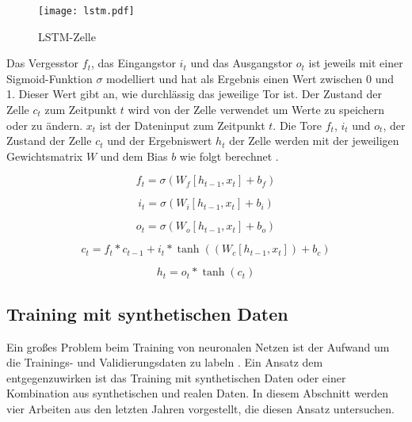 \begin{figure}[h]
\centering
\texttt{[image: lstm.pdf]}
\caption{\acl{LSTM}-Zelle \cite{olah2015lstm}}
\label{fig_lstm}
\end{figure}

Das Vergesstor $f_t$, das Eingangstor $i_t$ und das Ausgangstor $o_t$ ist jeweils mit einer Sigmoid-Funktion $\sigma$ modelliert und hat als Ergebnis einen Wert zwischen 0 und 1. Dieser Wert gibt an, wie durchlässig das jeweilige Tor ist. Der Zustand der Zelle $c_t$ zum Zeitpunkt $t$ wird von der Zelle verwendet um Werte zu speichern oder zu ändern. $x_t$ ist der Dateninput zum Zeitpunkt $t$. Die Tore $f_t$, $i_t$ und $o_t$, der Zustand der Zelle $c_t$ und der Ergebniswert $h_t$ der Zelle werden mit der jeweiligen Gewichtsmatrix $W$ und dem Bias $b$ wie folgt berechnet \cite{olah2015lstm}.

\begin{equation}
f_t = \sigma (W_f[h_{t-1}, x_t] + b_f)
\end{equation}

\begin{equation}
i_t = \sigma (W_i[h_{t-1}, x_t] + b_i)
\end{equation}

\begin{equation}
o_t = \sigma (W_o[h_{t-1}, x_t] + b_o)
\end{equation}

\begin{equation}
c_t = f_t * c_{t-1} + i_t * \tanh((W_c[h_{t-1}, x_t]) + b_c)
\end{equation}

\begin{equation}
h_t = o_t * \tanh(c_t)
\end{equation}


\subsection{Training mit synthetischen Daten}
\label{grundlagen_nn_synthetisch}

Ein großes Problem beim Training von neuronalen Netzen ist der Aufwand um die Trainings- und Validierungsdaten zu labeln \cite{richter2016playing}. Ein Ansatz dem entgegenzuwirken ist das Training mit synthetischen Daten oder einer Kombination aus synthetischen und realen Daten. In diesem Abschnitt werden vier Arbeiten aus den letzten Jahren vorgestellt, die diesen Ansatz untersuchen.

